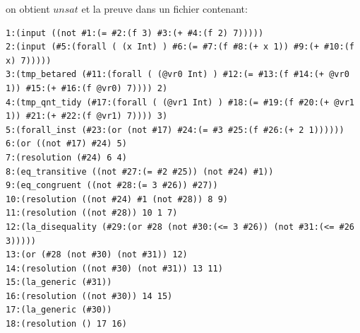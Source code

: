 \documentclass[11pt]{article}
\begin{document}
on obtient $unsat$ et la preuve dans un fichier contenant: 

\begin{lstlisting}[frame=no]
1:(input ((not #1:(= #2:(f 3) #3:(+ #4:(f 2) 7)))))
2:(input (#5:(forall ( (x Int) ) #6:(= #7:(f #8:(+ x 1)) #9:(+ #10:(f x) 7)))))
3:(tmp_betared (#11:(forall ( (@vr0 Int) ) #12:(= #13:(f #14:(+ @vr0 1)) #15:(+ #16:(f @vr0) 7)))) 2)
4:(tmp_qnt_tidy (#17:(forall ( (@vr1 Int) ) #18:(= #19:(f #20:(+ @vr1 1)) #21:(+ #22:(f @vr1) 7)))) 3)
5:(forall_inst (#23:(or (not #17) #24:(= #3 #25:(f #26:(+ 2 1))))))
6:(or ((not #17) #24) 5)
7:(resolution (#24) 6 4)
8:(eq_transitive ((not #27:(= #2 #25)) (not #24) #1))
9:(eq_congruent ((not #28:(= 3 #26)) #27))
10:(resolution ((not #24) #1 (not #28)) 8 9)
11:(resolution ((not #28)) 10 1 7)
12:(la_disequality (#29:(or #28 (not #30:(<= 3 #26)) (not #31:(<= #26 3)))))
13:(or (#28 (not #30) (not #31)) 12)
14:(resolution ((not #30) (not #31)) 13 11)
15:(la_generic (#31))
16:(resolution ((not #30)) 14 15)
17:(la_generic (#30))
18:(resolution () 17 16)
\end{lstlisting}
\end{document}
